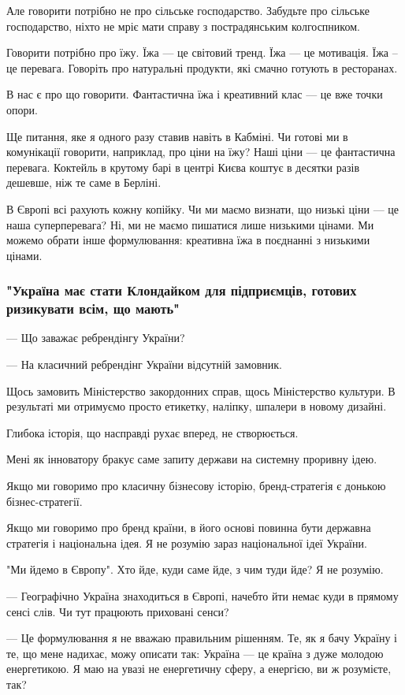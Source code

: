 Але говорити потрібно не про сільське господарство. Забудьте про сільське
господарство, ніхто не мріє мати справу з пострадянським колгоспником. 

Говорити потрібно про їжу. Їжа --- це світовий тренд. Їжа --- це мотивація. Їжа –
це перевага. Говоріть про натуральні продукти, які смачно готують в ресторанах. 

В нас є про що говорити. Фантастична їжа і креативний клас --- це вже точки
опори.

Ще питання, яке я одного разу ставив навіть в Кабміні. Чи готові ми в
комунікації говорити, наприклад, про ціни на їжу? Наші ціни --- це фантастична
перевага. Коктейль в крутому барі в центрі Києва коштує в десятки разів
дешевше, ніж те саме в Берліні.

В Європі всі рахують кожну копійку. Чи ми маємо визнати, що низькі ціни --- це
наша суперперевага? Ні, ми не маємо пишатися лише низькими цінами. Ми можемо
обрати інше формулювання: креативна їжа в поєднанні з низькими цінами.

\subsubsection{"Україна має стати Клондайком для підприємців, готових ризикувати всім, що мають"}

--- Що заважає ребрендінгу України?

--- На класичний ребрендінг України відсутній замовник.

Щось замовить Міністерство закордонних справ, щось Міністерство культури. В
результаті ми отримуємо просто етикетку, наліпку, шпалери в новому дизайні.

Глибока історія, що насправді рухає вперед, не створюється.

Мені як інноватору бракує саме запиту держави на системну проривну ідею.

Якщо ми говоримо про класичну бізнесову історію, бренд-стратегія є донькою
бізнес-стратегії. 

Якщо ми говоримо про бренд країни, в його основі повинна бути державна
стратегія і національна ідея. Я не розумію зараз національної ідеї України.

"Ми йдемо в Європу". Хто йде, куди саме йде, з чим туди йде? Я не розумію.

--- Географічно Україна знаходиться в Європі, начебто йти немає куди в прямому
сенсі слів. Чи тут працюють приховані сенси?

--- Це формулювання я не вважаю правильним рішенням. Те, як я бачу Україну і те,
що мене надихає, можу описати так: Україна --- це країна з дуже молодою
енергетикою. Я маю на увазі не енергетичну сферу, а енергією, ви ж розумієте,
так? 

